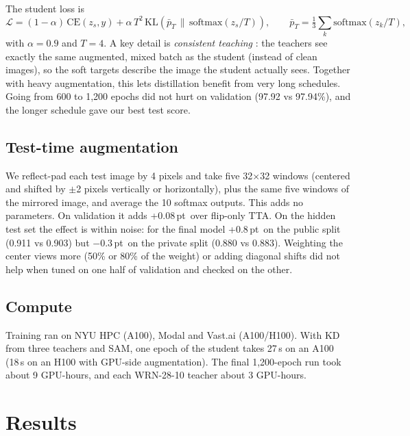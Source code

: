 \documentclass[10pt]{article}
\newcommand{\pt}{\,pt}
\begin{document}
The student loss is
\[
\mathcal{L} = (1-\alpha)\,\mathrm{CE}(z_s, y) + \alpha\,T^2\,\mathrm{KL}\!\left(\bar p_T \,\|\, \mathrm{softmax}(z_s/T)\right),\qquad
\bar p_T = \tfrac{1}{3}\textstyle\sum_k \mathrm{softmax}(z_k/T),
\]
with $\alpha{=}0.9$ and $T{=}4$. A key detail is \emph{consistent teaching} \cite{beyer2022patient}: the teachers see exactly the same augmented, mixed batch as the
student (instead of clean images), so the soft targets describe the image the student actually sees. Together with
heavy augmentation, this lets distillation benefit from very long schedules. Going from 600 to 1,200 epochs did not hurt
on validation (97.92 vs 97.94\%), and the longer schedule gave our best test score.

\subsection{Test-time augmentation}
We reflect-pad each test image by 4 pixels and take five 32$\times$32 windows (centered and shifted by $\pm$2 pixels
vertically or horizontally), plus the same five windows of the mirrored image, and average the 10 softmax
outputs. This adds no parameters. On validation it adds +0.08\pt\ over flip-only TTA. On the hidden test set the effect is within noise: for the final model
+0.8\pt\ on the public split (0.911 vs 0.903) but $-$0.3\pt\ on the private split (0.880 vs 0.883). Weighting the center views
more (50\% or 80\% of the weight) or adding diagonal shifts did not help when tuned on one half of
validation and checked on the other.

\subsection{Compute}
Training ran on NYU HPC (A100), Modal and Vast.ai (A100/H100). With KD from three teachers and SAM, one
epoch of the student takes 27\,s on an A100 (18\,s on an H100 with GPU-side augmentation). The final
1,200-epoch run took about 9 GPU-hours, and each WRN-28-10 teacher about 3 GPU-hours.

\section{Results}
\end{document}
